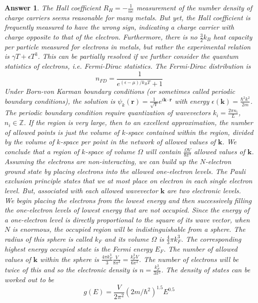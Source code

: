 \documentclass[a4paper]{article}
\newtheorem{ans}{Answer}[subsection]
\theoremstyle{new}
\begin{document}
\begin{ans}
The Hall coefficient $R_H=-\frac{1}{ne}$ measurement of the number density of charge carriers seems reasonable for many metals. But yet, the Hall coefficient is frequently measured to have the wrong sign, indicating a charge carrier with charge opposite to that of the electron. Furthermore, there is no $\frac{3}{2}k_B$ heat capacity per particle measured for electrons in metals, but rather the experimental relation is $\gamma T+\epsilon T^3$. This can be partially resolved if we further consider the quantum statistics of electrons, i.e. Fermi-Dirac statistics. The Fermi-Dirac distribution is
$$n_{FD}=\frac{1}{e^{(\epsilon-\mu)/k_BT}+1}$$
Under Born-von Karman boundary conditions (or sometimes called periodic boundary conditions), the solution is $\psi_k(\mathbf{r})=\frac{1}{\sqrt{V}}e^{i\mathbf{k}\cdot\mathbf{r}}$ with energy $\epsilon(\mathbf{k})=\frac{\hbar^2k^2}{2m}$. The periodic boundary condition require quantization of wavevectors $k_i=\frac{2\pi n_i}{L}$, $n_i\in\mathbb{Z}$. If the region is very large, then to an excellent approximation, the number of allowed points is just the volume of $k$-space contained within the region, divided by the volume of $k$-space per point in the network of allowed values of $\mathbf{k}$. We conclude that a region of $k$-space of volume $\Omega$ will contain $\frac{\Omega V}{8\pi^3}$ allowed values of $\mathbf{k}$.\\[5pt]
Assuming the electrons are non-interacting, we can build up the $N$-electron ground state by placing electrons into the allowed one-electron levels. The Pauli exclusion principle states that we at most place on electron in each single electron level. But, associated with each allowed wavevector $\mathbf{k}$ are two electronic levels.\\[5pt]
We begin placing the electrons from the lowest energy and then successively filling the one-electron levels of lowest energy that are not occupied. Since the energy of a one-electron level is directly proportional to the square of its wave vector, when $N$ is enormous, the occupied region will be indistinguishable from a sphere. The radius of this sphere is called $k_F$ and its volume $\Omega$ is $\frac{4}{3}\pi k_F^3$. The corresponding highest energy occupied state is the Fermi energy $E_F$. The number of allowed values of $\mathbf{k}$ within the sphere is $\frac{4\pi k_F^3}{3}\frac{V}{8\pi^3}=\frac{k_F^3V}{6\pi^2}$. The number of electrons will be twice of this and so the electronic density is $n=\frac{k_F^3}{3\pi^2}$. The density of states can be worked out to be
$$g(E)=\frac{V}{2\pi^2}(2m/\hbar^2)^{1.5}E^{0.5}$$

\end{ans}
\end{document}

